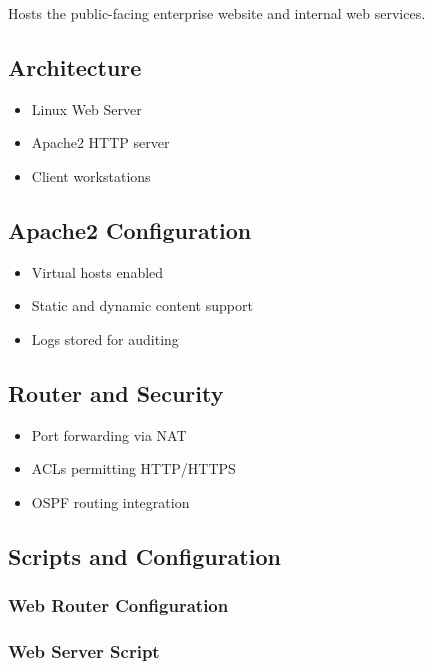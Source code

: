\documentclass[12pt,a4paper]{article}
\begin{document}
Hosts the public-facing enterprise website and internal web services.

\subsection{Architecture}

\begin{itemize}
  \item Linux Web Server
  \item Apache2 HTTP server
  \item Client workstations
\end{itemize}

\subsection{Apache2 Configuration}

\begin{itemize}
  \item Virtual hosts enabled
  \item Static and dynamic content support
  \item Logs stored for auditing
\end{itemize}

\subsection{Router and Security}

\begin{itemize}
  \item Port forwarding via NAT
  \item ACLs permitting HTTP/HTTPS
  \item OSPF routing integration
\end{itemize}

\subsection{Scripts and Configuration}

\subsubsection{Web Router Configuration}



\subsubsection{Web Server Script}
\end{document}
